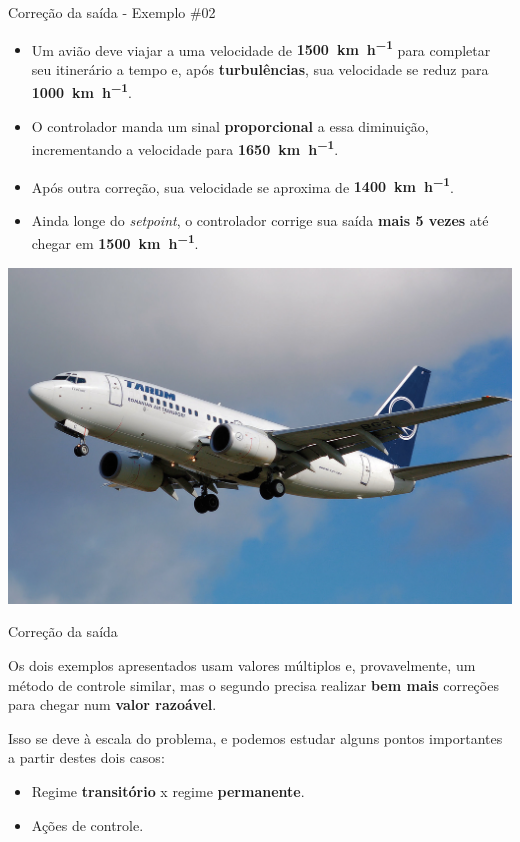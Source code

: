 \begin{frame}{Correção da saída - Exemplo \#02}
	\begin{block}{}
		\begin{itemize}
			\item Um avião deve viajar a uma velocidade de \textbf{\SI{1500}{\kilo\meter\per\hour}} para completar seu itinerário a tempo e, após \textbf{turbulências}, sua velocidade se reduz para \textbf{\SI{1000}{\kilo\meter\per\hour}}.
			\item O controlador manda um sinal \textbf{proporcional} a essa diminuição, incrementando a velocidade para \textbf{\SI{1650}{\kilo\meter\per\hour}}.
			\item Após outra correção, sua velocidade se aproxima de \textbf{\SI{1400}{\kilo\meter\per\hour}}.
			\item Ainda longe do \textit{setpoint}, o controlador corrige sua saída \textbf{mais 5 vezes} até chegar em \textbf{\SI{1500}{\kilo\meter\per\hour}}.
		\end{itemize}
	\end{block}

	\centering
	\includegraphics[height=0.4\textheight]{Figuras/Ch11/fig9}
\end{frame}


\begin{frame}{Correção da saída}
	\begin{block}{}
		Os dois exemplos apresentados usam valores múltiplos e, provavelmente, um método de controle similar, mas o segundo precisa realizar \textbf{bem mais} correções para chegar num \textbf{valor razoável}.
		
		\medskip
		
		Isso se deve à escala do problema, e podemos estudar alguns pontos importantes a partir destes dois casos:
		\begin{itemize}
			\item Regime \textbf{transitório} x regime \textbf{permanente}.
			\item Ações de controle.
		\end{itemize}
	\end{block}
\end{frame}


